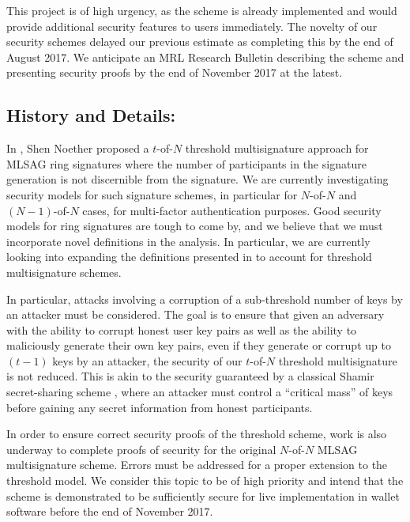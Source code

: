 \documentclass[12pt,english]{mrl}
\theoremstyle{definition}
\numberwithin{equation}{section}
\numberwithin{figure}{section}
\numberwithin{equation}{section}
\numberwithin{equation}{section}
\numberwithin{figure}{section}
\begin{document}
This project is of high urgency, as the scheme is already implemented and would provide additional security features to users immediately. The novelty of our security schemes delayed our previous estimate as completing this by the end of August 2017. We anticipate an MRL Research Bulletin describing the scheme and presenting security proofs by the end of November 2017 at the latest.

\subsection{History and Details:} 

In \cite{noether2016ring}, Shen Noether proposed a $t$-of-$N$ threshold multisignature approach for MLSAG ring signatures where the number of participants in the signature generation is not discernible from the signature. We are currently investigating security models for such signature schemes, in particular for $N$-of-$N$ and $(N-1)$-of-$N$ cases, for multi-factor authentication purposes. Good security models for ring signatures are tough to come by, and we believe that we must incorporate novel definitions in the analysis. In particular, we are currently looking into expanding the definitions presented in \cite{bender2006ring} to account for threshold multisignature schemes.

In particular, attacks involving a corruption of a sub-threshold number of keys by an attacker must be considered. The goal is to ensure that given an adversary with the ability to corrupt honest user key pairs as well as the ability to maliciously generate their own key pairs, even if they generate or corrupt up to $(t-1)$ keys by an attacker, the security of our $t$-of-$N$ threshold multisignature is not reduced. This is akin to the security guaranteed by a classical Shamir secret-sharing scheme \cite{shamir1979share}, where an attacker must control a ``critical mass'' of keys before gaining any secret information from honest participants.

In order to ensure correct security proofs of the threshold scheme, work is also underway to complete proofs of security for the original $N$-of-$N$ MLSAG multisignature scheme. Errors must be addressed for a proper extension to the threshold model. We consider this topic to be of high priority and intend that the scheme is demonstrated to be sufficiently secure for live implementation in wallet software before the end of November 2017.
\end{document}
